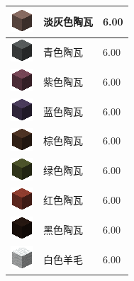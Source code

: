 \documentclass[UTF8]{ctexart}
\begin{document}
\begin{longtable}[]{|p{1cm}|p{8cm}|p{1.5cm}|}
	\hline
	\includegraphics{.workspace/icons/minecraft/minecraft__stained_hardened_clay__8.png} & 淡灰色陶瓦 &6.00\\
	\hline
	\includegraphics{.workspace/icons/minecraft/minecraft__stained_hardened_clay__9.png} & 青色陶瓦 &6.00\\
	\hline
	\includegraphics{.workspace/icons/minecraft/minecraft__stained_hardened_clay__10.png} & 紫色陶瓦 &6.00\\
	\hline
	\includegraphics{.workspace/icons/minecraft/minecraft__stained_hardened_clay__11.png} & 蓝色陶瓦 &6.00\\
	\hline
	\includegraphics{.workspace/icons/minecraft/minecraft__stained_hardened_clay__12.png} & 棕色陶瓦 &6.00\\
	\hline
	\includegraphics{.workspace/icons/minecraft/minecraft__stained_hardened_clay__13.png} & 绿色陶瓦 &6.00\\
	\hline
	\includegraphics{.workspace/icons/minecraft/minecraft__stained_hardened_clay__14.png} & 红色陶瓦 &6.00\\
	\hline
	\includegraphics{.workspace/icons/minecraft/minecraft__stained_hardened_clay__15.png} & 黑色陶瓦 &6.00\\
	\hline
	\includegraphics{.workspace/icons/minecraft/minecraft__wool__0.png} & 白色羊毛 &6.00\\

\end{longtable}
\end{document}
